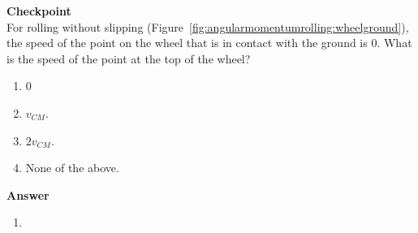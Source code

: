 \begin{framed}
\textbf{Checkpoint}\\
For rolling without slipping (Figure~\ref{fig:angularmomentumrolling:wheelground}), the speed of the point on the wheel that is in contact with the ground is 0. What is the speed of the point at the top of the wheel?

\begin{enumerate}
\item 0
\item $v_{CM}$.
\item $2v_{CM}$.
\item None of the above.
\end{enumerate}

\begin{framed}
\textbf{Answer}\\
\begin{enumerate}[resume]
\item
\end{enumerate}
\end{framed}
\end{framed}

